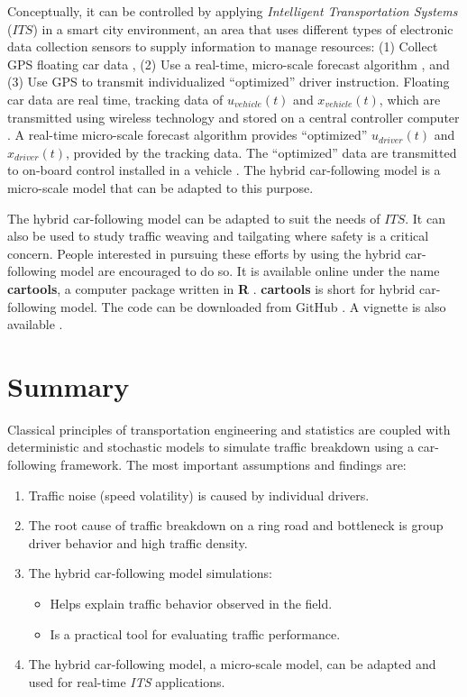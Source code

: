 \documentclass[Proceedings]{ascelike}
\begin{document}
 Conceptually, it can be controlled  by applying \emph{Intelligent Transportation Systems} ($ITS$) in a smart city environment, an area that uses different types of electronic data collection sensors to supply information to manage resources: (1) Collect GPS floating car data \cite{KENDZIORRA2016198}, (2) Use a real-time, micro-scale forecast algorithm \cite{trieber}, and (3) Use GPS to transmit individualized ``optimized'' driver instruction. Floating car data are  real time, tracking data of $u_{vehicle}(t)$ and  $x_{vehicle}(t)$, which are transmitted using wireless technology and stored on a central controller computer \cite{tarnoff}. A real-time micro-scale forecast algorithm provides ``optimized'' $u_{driver}(t)$ and  $x_{driver}(t)$, provided by the tracking data. The ``optimized'' data are transmitted to on-board control installed in a vehicle \cite{5gaa}. The hybrid car-following model is a  micro-scale model that can be adapted to this purpose. 
 
 The hybrid car-following model can be adapted to suit the needs of $ITS$. It can also be used to study traffic weaving and tailgating where  safety is a critical concern. People interested in pursuing these efforts by using the hybrid car-following model are encouraged to do so. It is available online under the name \textbf{cartools}, a computer package written in \textbf{R}  \cite{cran}.   \textbf{cartools} is short for hybrid car-following model. The  code can be downloaded from GitHub  \cite{pjo2018}. A vignette is also available \cite{cartools}. 




\section{Summary}

Classical principles of transportation engineering and statistics are coupled with deterministic and stochastic models  to simulate traffic breakdown  using a car-following framework. The most important assumptions and findings are:


\begin{enumerate}
\item Traffic noise (speed volatility) is caused by individual drivers.
\item The root cause of traffic breakdown on a ring road and bottleneck is group driver behavior and high traffic density.
\item The hybrid car-following model simulations:
\begin{itemize}
\item Helps explain traffic behavior observed in the field.
\item Is a practical tool for evaluating traffic performance.
\end{itemize}
\item The hybrid car-following model, a micro-scale model,  can be adapted and used for real-time \emph{ITS} applications.
\end{enumerate}
\end{document}
